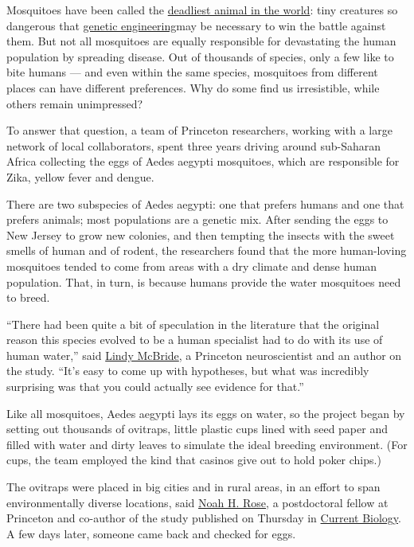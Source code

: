 Mosquitoes have been called the
\href{https://www.gatesnotes.com/health/most-lethal-animal-mosquito-week}{deadliest
animal in the world}: tiny creatures so dangerous that
\href{https://www.nytimes3xbfgragh.onion/2020/01/08/magazine/gene-drive-mosquitoes.html}{genetic
engineering}may be necessary to win the battle against them. But not all
mosquitoes are equally responsible for devastating the human population
by spreading disease. Out of thousands of species, only a few like to
bite humans --- and even within the same species, mosquitoes from
different places can have different preferences. Why do some find us
irresistible, while others remain unimpressed?

To answer that question, a team of Princeton researchers, working with a
large network of local collaborators, spent three years driving around
sub-Saharan Africa collecting the eggs of Aedes aegypti mosquitoes,
which are responsible for Zika, yellow fever and dengue.

There are two subspecies of Aedes aegypti: one that prefers humans and
one that prefers animals; most populations are a genetic mix. After
sending the eggs to New Jersey to grow new colonies, and then tempting
the insects with the sweet smells of human and of rodent, the
researchers found that the more human-loving mosquitoes tended to come
from areas with a dry climate and dense human population. That, in turn,
is because humans provide the water mosquitoes need to breed.

``There had been quite a bit of speculation in the literature that the
original reason this species evolved to be a human specialist had to do
with its use of human water,'' said
\href{https://eeb.princeton.edu/people/lindy-mcbride}{Lindy McBride}, a
Princeton neuroscientist and an author on the study. ``It's easy to come
up with hypotheses, but what was incredibly surprising was that you
could actually see evidence for that.''

Like all mosquitoes, Aedes aegypti lays its eggs on water, so the
project began by setting out thousands of ovitraps, little plastic cups
lined with seed paper and filled with water and dirty leaves to simulate
the ideal breeding environment. (For cups, the team employed the kind
that casinos give out to hold poker chips.)

The ovitraps were placed in big cities and in rural areas, in an effort
to span environmentally diverse locations, said
\href{https://www.noahhrose.com/}{Noah H. Rose}, a postdoctoral fellow
at Princeton and co-author of the study published on Thursday in
\href{https://www.cell.com/current-biology/fulltext/S0960-9822(20)30978-7}{Current
Biology}. A few days later, someone came back and checked for eggs.

